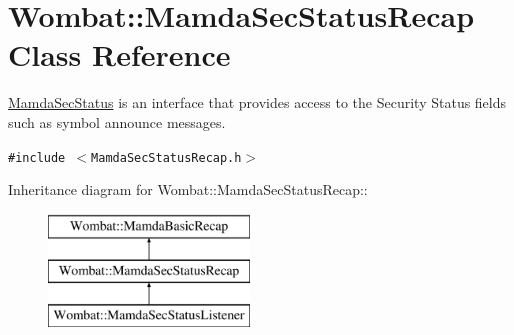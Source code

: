 \hypertarget{classWombat_1_1MamdaSecStatusRecap}{
\section{Wombat::Mamda\-Sec\-Status\-Recap Class Reference}
\label{classWombat_1_1MamdaSecStatusRecap}
}
\hyperlink{classWombat_1_1MamdaSecStatus}{Mamda\-Sec\-Status} is an interface that provides access to the Security Status fields such as symbol announce messages.  


{\tt \#include $<$Mamda\-Sec\-Status\-Recap.h$>$}

Inheritance diagram for Wombat::Mamda\-Sec\-Status\-Recap::\begin{figure}[H]
\begin{center}
\leavevmode
\includegraphics[height=3cm]{classWombat_1_1MamdaSecStatusRecap}
\end{center}
\end{figure}

